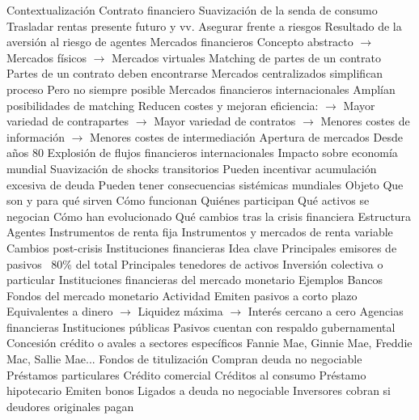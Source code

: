 \documentclass{nuevotema}
\begin{document}
\begin{esquemal}
	\1[] 
		\2 Contextualización
			\3 Contrato financiero
				\4 Suavización de la senda de consumo
				\4[] Trasladar rentas presente futuro y vv.
				\4 Asegurar frente a riesgos
				\4[] Resultado de la aversión al riesgo de agentes
			\3 Mercados financieros
				\4[] Concepto abstracto
				\4[] $\to$ Mercados físicos
				\4[] $\to$ Mercados virtuales
				\4 Matching de partes de un contrato
				\4[] Partes de un contrato deben encontrarse
				\4[] Mercados centralizados simplifican proceso
				\4[] Pero no siempre posible
			\3 Mercados financieros internacionales
				\4 Amplían posibilidades de matching
				\4 Reducen costes y mejoran eficiencia:
				\4[] $\to$ Mayor variedad de contrapartes
				\4[] $\to$ Mayor variedad de contratos
				\4[] $\to$ Menores costes de información
				\4[] $\to$ Menores costes de intermediación
				\4 Apertura de mercados
				\4[] Desde años 80
				\4[] Explosión de flujos financieros internacionales
				\4 Impacto sobre economía mundial
				\4[] Suavización de shocks transitorios
				\4[] Pueden incentivar acumulación excesiva de deuda
				\4[] Pueden tener consecuencias sistémicas mundiales
		\2 Objeto
			\3 Que son y para qué sirven
			\3 Cómo funcionan
			\3 Quiénes participan
			\3 Qué activos se negocian
			\3 Cómo han evolucionado
				\4 Qué cambios tras la crisis financiera
		\2 Estructura
			\3 Agentes
			\3 Instrumentos de renta fija
			\3 Instrumentos y mercados de renta variable
			\3 Cambios post-crisis
	\1 
		\2 Instituciones financieras
			\3 Idea clave
				\4 Principales emisores de pasivos
				\4[] ~80\% del total
				\4 Principales tenedores de activos
				\4[] Inversión colectiva o particular
			\3 Instituciones financieras del mercado monetario
				\4 Ejemplos
				\4[] Bancos
				\4[] Fondos del mercado monetario
				\4 Actividad
				\4[] Emiten pasivos a corto plazo
				\4[] Equivalentes a dinero
				\4[] $\to$ Liquidez máxima
				\4[] $\to$ Interés cercano a cero
			\3 Agencias financieras
				\4 Instituciones públicas
				\4[] Pasivos cuentan con respaldo gubernamental
				\4 Concesión crédito o avales a sectores específicos
				\4 Fannie Mae, Ginnie Mae, Freddie Mac, Sallie Mae...
			\3 Fondos de titulización
				\4 Compran deuda no negociable
				\4[] Préstamos particulares
				\4[] Crédito comercial
				\4[] Créditos al consumo
				\4[] Préstamo hipotecario
				\4 Emiten bonos
				\4[] Ligados a deuda no negociable
				\4[] Inversores cobran si deudores originales pagan

\end{esquemal}
\end{document}

